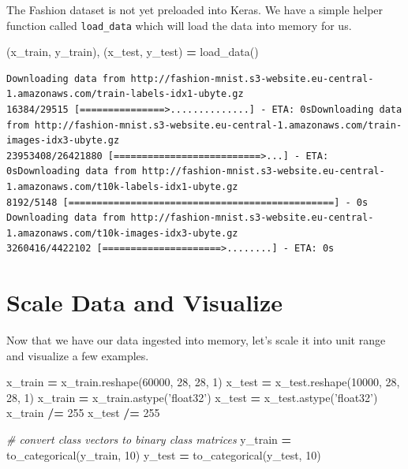\documentclass[]{book}
\newenvironment{Shaded}{\begin{snugshade}}{\end{snugshade}}
\newcommand{\DecValTok}[1]{\textcolor[rgb]{0.00,0.00,0.81}{#1}}
\newcommand{\StringTok}[1]{\textcolor[rgb]{0.31,0.60,0.02}{#1}}
\newcommand{\CommentTok}[1]{\textcolor[rgb]{0.56,0.35,0.01}{\textit{#1}}}
\newcommand{\OperatorTok}[1]{\textcolor[rgb]{0.81,0.36,0.00}{\textbf{#1}}}
\newcommand{\NormalTok}[1]{#1}
\theoremstyle{definition}
\theoremstyle{definition}
\theoremstyle{definition}
\theoremstyle{remark}
\begin{document}
The Fashion dataset is not yet preloaded into Keras. We have a simple
helper function called \texttt{load\_data} which will load the data into
memory for us.

\begin{Shaded}
\begin{Highlighting}[]
\NormalTok{(x_train, y_train), (x_test, y_test) }\OperatorTok{=}\NormalTok{ load_data()}
\end{Highlighting}
\end{Shaded}

\begin{verbatim}
Downloading data from http://fashion-mnist.s3-website.eu-central-1.amazonaws.com/train-labels-idx1-ubyte.gz
16384/29515 [===============>..............] - ETA: 0sDownloading data from http://fashion-mnist.s3-website.eu-central-1.amazonaws.com/train-images-idx3-ubyte.gz
23953408/26421880 [==========================>...] - ETA: 0sDownloading data from http://fashion-mnist.s3-website.eu-central-1.amazonaws.com/t10k-labels-idx1-ubyte.gz
8192/5148 [===============================================] - 0s
Downloading data from http://fashion-mnist.s3-website.eu-central-1.amazonaws.com/t10k-images-idx3-ubyte.gz
3260416/4422102 [=====================>........] - ETA: 0s
\end{verbatim}

\section{Scale Data and Visualize}\label{scale-data-and-visualize}

Now that we have our data ingested into memory, let's scale it into unit
range and visualize a few examples.

\begin{Shaded}
\begin{Highlighting}[]
\NormalTok{x_train }\OperatorTok{=}\NormalTok{ x_train.reshape(}\DecValTok{60000}\NormalTok{, }\DecValTok{28}\NormalTok{, }\DecValTok{28}\NormalTok{, }\DecValTok{1}\NormalTok{)}
\NormalTok{x_test }\OperatorTok{=}\NormalTok{ x_test.reshape(}\DecValTok{10000}\NormalTok{, }\DecValTok{28}\NormalTok{, }\DecValTok{28}\NormalTok{, }\DecValTok{1}\NormalTok{)}
\NormalTok{x_train }\OperatorTok{=}\NormalTok{ x_train.astype(}\StringTok{'float32'}\NormalTok{)}
\NormalTok{x_test }\OperatorTok{=}\NormalTok{ x_test.astype(}\StringTok{'float32'}\NormalTok{)}
\NormalTok{x_train }\OperatorTok{/=} \DecValTok{255}
\NormalTok{x_test }\OperatorTok{/=} \DecValTok{255}

\CommentTok{# convert class vectors to binary class matrices}
\NormalTok{y_train }\OperatorTok{=}\NormalTok{ to_categorical(y_train, }\DecValTok{10}\NormalTok{)}
\NormalTok{y_test }\OperatorTok{=}\NormalTok{ to_categorical(y_test, }\DecValTok{10}\NormalTok{)}
\end{Highlighting}
\end{Shaded}
\end{document}
